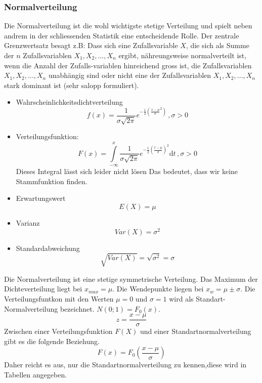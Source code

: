 \subsubsection{Normalverteilung}\label{theorie:normalverteilung}
Die Normalverteilung ist die wohl wichtigste stetige Verteilung und spielt neben andrem in der schliessenden Statistik eine entscheidende Rolle. Der zentrale Grenzwertsatz besagt z.B: Dass sich eine Zufallsvariable $X$, die sich als Summe der $n$ Zufallsvariablen $X_1, X_2, \ldots, X_n$ ergibt, nähreungsweise normalverteilt ist, wenn die Anzahl der Zufalls-variablen hinreichend gross ist, die Zufallsvariablen $X_1, X_2,\ldots , X_n$ unabhängig sind oder nicht eine der Zufallsvariablen $X_1, X_2, \ldots ,X_n$ stark dominant ist (sehr salopp formuliert).
\begin{itemize}
	\item Wahrscheinlichkeitsdichtverteilung
	\begin{equation}
	f(x) = \frac{1}{\sigma\sqrt{2\pi}}e^{-\frac{1}{2}\left(\frac{x-\mu}{\sigma}^{2}\right)}\, , \sigma > 0
	\end{equation}
	\item Verteilungsfunktion:
	\begin{equation}
	F(x) = \int\limits_{-\infty}^{x}\frac{1}{\sigma\sqrt{2\pi}}e^{-\frac{1}{2}\left(\frac{t-\mu}{\sigma}\right)^2}\mathrm{d}t\, ,\sigma > 0
	\end{equation}
	Dieses Integral lässt sich leider nicht lösen Das bedeutet, dass wir keine Stammfunktion finden.
	\item Erwartungswert
	\begin{equation}
	E(X) = \mu
	\end{equation}
	\item Varianz
	\begin{equation}
	Var(X) = \sigma^2
	\end{equation}
	\item Standardabweichung
	\begin{equation}
	\sqrt{Var(X)} = \sqrt{\sigma^2} = \sigma
	\end{equation}
\end{itemize}
Die Normalverteilung ist eine stetige symmetrische Verteilung. Das Maximum der Dichteverteilung liegt bei $x_{max}=\mu$. Die Wendepunkte liegen bei $x_w=\mu\pm\sigma$. Die Verteilungsfuntkon mit den Werten $\mu=0$ und $\sigma=1$ wird als Standart-Normalverteilung bezeichnet. $N(0;1)=F_0(x)$.
\begin{equation}
z=\frac{x-\mu}{\sigma}
\end{equation}
Zwischen einer Verteilungsfunktion $F(X)$ und einer Standartnormalverteilung gibt es die folgende Beziehung.
\begin{equation}
F(x)=F_0\left(\frac{x-\mu}{\sigma}\right)
\end{equation}
Daher reicht es aus, nur die Standartnormalverteilung zu kennen,diese wird in Tabellen angegeben.
